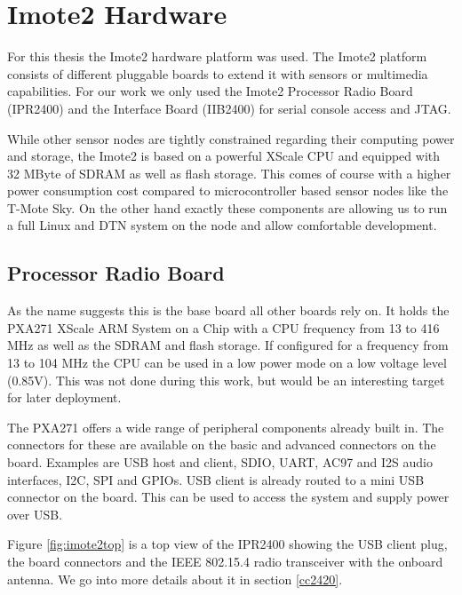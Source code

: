 \chapter{Imote2 Hardware}
For this thesis the Imote2 hardware platform was used. The Imote2 platform
consists of different pluggable boards to extend it with sensors or multimedia
capabilities. For our work we only used the Imote2 Processor Radio Board
(IPR2400) and the Interface Board (IIB2400) for serial console access and JTAG.

While other sensor nodes are tightly constrained regarding their computing power
and storage, the Imote2 is based on a powerful XScale CPU and equipped with 32
MByte of SDRAM as well as flash storage. This comes of course with a higher power
consumption cost compared to microcontroller based sensor nodes like the T-Mote
Sky. On the other hand exactly these components are allowing us to run a full
Linux and DTN system on the node and allow comfortable development.

\section{Processor Radio Board}
As the name suggests this is the base board all other boards rely on. It holds
the PXA271 XScale ARM System on a Chip with a CPU frequency from 13 to 416 MHz
as well as the SDRAM and flash storage. If configured for a frequency from 13
to 104 MHz the CPU can be used in a low power mode on a low voltage level
(0.85V). This was not done during this work, but would be an interesting target
for later deployment.

The PXA271 offers a wide range of peripheral components already built in. The
connectors for these are available on the basic and advanced connectors on the
board. Examples are USB host and client, SDIO, UART, AC97 and I2S audio
interfaces, I2C, SPI and GPIOs. USB client is already routed to a mini USB
connector on the board. This can be used to access the system and supply power
over USB.

Figure \ref{fig:imote2top} is a top view of the IPR2400 showing the USB client plug,
the board connectors and the IEEE 802.15.4 radio transceiver with the onboard
antenna. We go into more details about it in section \ref{cc2420}.

